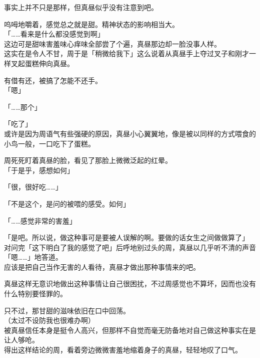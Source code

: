 事实上并不只是那样，但真昼似乎没有注意到吧。

呜呣地嚼着，感觉总之就是甜。精神状态的影响相当大。\\

「……看来是什么都没感觉到啊」\\

这边可是甜味害羞味心痒味全部尝了个遍，真昼那边却一脸没事人样。\\

这实在是令人不甘，周于是「稍微给我下」这么说着从真昼手上夺过叉子和刚才一样叉起蛋糕伸向真昼。

有借有还，被搞了怎能不还手。\\

「嗯」

「……那个」

「吃了」\\

或许是因为周语气有些强硬的原因，真昼小心翼翼地，像是被以同样的方式喂食的小鸟一般，一口吃下了蛋糕。

周死死盯着真昼的脸，看见了那脸上微微泛起的红晕。\\

「于是乎，感想如何」

「很，很好吃……」

「不是这个，是问的被喂的感受。如何」

「……感觉非常的害羞」

「是吧。所以说，做这种事可是要被人误解的啊。要做的话女生之间做做算了」\\

对问完「这下明白了我的感觉了吧」后呼地别过头的周，真昼以几乎听不清的声音「嗯……」地答道。\\

应该是把自己当作无害的人看待，真昼才做出那种事情来的吧。

真昼这样无意识地做出这种事情让自己很困扰，不过周感觉也不算坏，因而也没有什么特别要怪罪的。

只不过，那甘甜的滋味依旧在口中回荡。\\

（太过不设防我也很难办啊）\\

被真昼信任本身是挺令人高兴，但那样不自觉而毫无防备地对自己做这种事实在是让人够呛。\\

得出这样结论的周，看着旁边微微害羞地缩着身子的真昼，轻轻地叹了口气。\\
